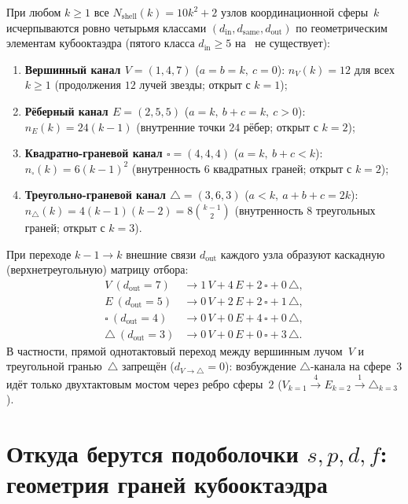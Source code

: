 \begin{theorem}
\label{thm:floor1-four-channels}
При любом $k\ge 1$ все $N_{\mathrm{shell}}(k)=10k^2+2$ узлов координационной сферы~$k$
исчерпываются ровно четырьмя классами $(d_{\mathrm{in}},d_{\mathrm{same}},d_{\mathrm{out}})$
по геометрическим элементам кубооктаэдра (пятого класса $d_{\mathrm{in}}\ge 5$ на \latGCKshort\ не существует):
\begin{enumerate}[noitemsep]
\item \textbf{Вершинный канал $V=(1,4,7)$} ($a=b=k,\ c=0$):
  $n_V(k)=12$ для всех $k\ge 1$ (продолжения $12$ лучей звезды; открыт с $k=1$);
\item \textbf{Рёберный канал $E=(2,5,5)$} ($a=k,\ b+c=k,\ c>0$):
  $n_E(k)=24(k-1)$ (внутренние точки $24$ рёбер; открыт с $k=2$);
\item \textbf{Квадратно-граневой канал $\square=(4,4,4)$} ($a=k,\ b+c<k$):
  $n_{\square}(k)=6(k-1)^2$ (внутренность $6$ квадратных граней; открыт с $k=2$);
\item \textbf{Треугольно-граневой канал $\triangle=(3,6,3)$} ($a<k,\ a+b+c=2k$):
  $n_{\triangle}(k)=4(k-1)(k-2)=8\binom{k-1}{2}$ (внутренность $8$ треугольных граней; открыт с $k=3$).
\end{enumerate}
При переходе $k-1\to k$ внешние связи $d_{\mathrm{out}}$ каждого узла образуют каскадную (верхнетреугольную) матрицу отбора:
\begin{align*}
  V\ (d_{\mathrm{out}}=7) &\longrightarrow 1\,V + 4\,E + 2\,\square + 0\,\triangle,\\
  E\ (d_{\mathrm{out}}=5) &\longrightarrow 0\,V + 2\,E + 2\,\square + 1\,\triangle,\\
  \square\ (d_{\mathrm{out}}=4) &\longrightarrow 0\,V + 0\,E + 4\,\square + 0\,\triangle,\\
  \triangle\ (d_{\mathrm{out}}=3) &\longrightarrow 0\,V + 0\,E + 0\,\square + 3\,\triangle.
\end{align*}
В частности, прямой однотактовый переход между вершинным лучом~$V$ и треугольной гранью~$\triangle$
запрещён ($d_{V\to\triangle}=0$): возбуждение $\triangle$-канала на сфере~$3$ идёт только двухтактовым мостом
через ребро сферы~$2$ ($V_{k=1}\xrightarrow{4} E_{k=2}\xrightarrow{1}\triangle_{k=3}$).
\end{theorem}

\section{Откуда берутся подоболочки \texorpdfstring{$s, p, d, f$}{s, p, d, f}: геометрия граней кубооктаэдра}
\label{sec:floor1-spdf-correspondence}

